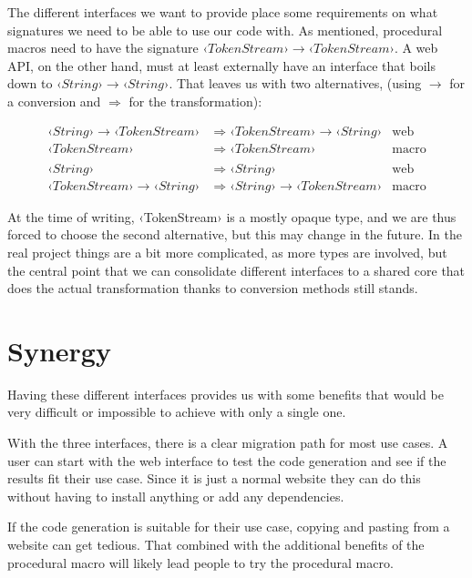 The different interfaces we want to provide place some requirements on what signatures we need to be able to use our code with. As mentioned, procedural macros need to have the signature $ ‹TokenStream› \rightarrow ‹TokenStream› $. A web API, on the other hand, must at least externally have an interface that boils down to $ ‹String› \rightarrow ‹String› $. That leaves us with two alternatives, (using $\rightarrow$ for a conversion and $\Rightarrow$ for the transformation):

\begin{align*}
‹String› \rightarrow ‹TokenStream› &\Rightarrow ‹TokenStream› \rightarrow ‹String› & \text{web} \\
                   ‹TokenStream› &\Rightarrow ‹TokenStream›                    & \text{macro} \\
\\
                        ‹String› &\Rightarrow ‹String›                         & \text{web} \\
‹TokenStream› \rightarrow ‹String› &\Rightarrow ‹String› \rightarrow ‹TokenStream› & \text{macro}
\end{align*}

At the time of writing, ‹TokenStream› is a mostly opaque type, and we are thus forced to choose the second alternative, but this may change in the future. In the real project things are a bit more complicated, as more types are involved, but the central point that we can consolidate different interfaces to a shared core that does the actual transformation thanks to conversion methods still stands.

\section{Synergy}

Having these different interfaces provides us with some benefits that would be very difficult or impossible to achieve with only a single one.

With the three interfaces, there is a clear migration path for most use cases. A user can start with the web interface to test the code generation and see if the results fit their use case. Since it is just a normal website they can do this without having to install anything or add any dependencies.

If the code generation is suitable for their use case, copying and pasting from a website can get tedious. That combined with the additional benefits of the procedural macro will likely lead people to try the procedural macro.

